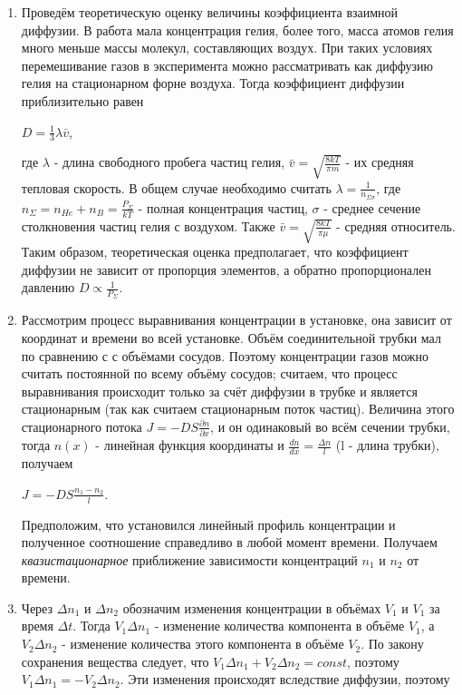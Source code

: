 \documentclass[12pt,a4paper]{article}
\begin{document}
\begin{enumerate}
\item Проведём теоретическую оценку величины коэффициента взаимной диффузии. В работа мала концентрация гелия, более того, масса атомов гелия много меньше массы молекул, составляющих воздух. При таких условиях перемешивание газов в эксперимента можно рассматривать как диффузию гелия на стационарном форне воздуха. Тогда коэффициент диффузии приблизительно равен
\begin{center}
$D = \frac{1}{3}\lambda \bar v$,
\end{center}
где $\lambda$ - длина свободного пробега частиц гелия, $\bar v = \sqrt{\frac{8kT}{\pi m}}$ - их средняя тепловая скорость. В общем случае необходимо считать $\lambda = \frac{1}{n_{\Sigma \sigma}}$, где $n_{\Sigma} = n_{He} + n_{B} = \frac{P_{\Sigma}}{kT}$ - полная концентрация частиц, $\sigma$ -  среднее сечение столкновения частиц гелия с воздухом. Также  $\bar v = \sqrt{\frac{8kT}{\pi \mu}}$ - средняя относитель. Таким образом, теоретическая оценка предполагает, что коэффициент диффузии не зависит от пропорция элементов, а обратно пропорционален давлению $D \propto \frac{1}{P_{\Sigma}}$.
\item  Рассмотрим процесс выравнивания концентрации в установке, она зависит от координат и времени во всей установке. Объём соединительной трубки мал по сравнению с с объёмами сосудов. Поэтому концентрации газов можно считать постоянной по всему объёму сосудов; считаем, что процесс выравнивания происходит только за счёт диффузии в трубке и является стационарным (так как считаем стационарным поток частиц). Величина этого стационарного потока $J = -DS\frac{\partial n}{\partial x}$, и он одинаковый во всём сечении трубки, тогда $n(x)$ - линейная функция координаты и $\frac{dn}{dx} = \frac{\Delta n}{l}$ (l - длина трубки), получаем 
\begin{center}
$J = -DS \frac{n_{1}-n_{2}}{l}$.
\end{center}
Предположим, что установился линейный профиль концентрации и полученное соотношение справедливо в любой момент времени. Получаем {\sl квазистационарное} приближение зависимости концентраций $n_1$ и $n_2$ от времени.
\item Через $\Delta n_1$ и $\Delta n_2$ обозначим изменения концентрации в объёмах $V_1$ и $V_1$ за время $\Delta t$. Тогда $V_1 \Delta n_1$ - изменение количества компонента в объёме $V_1$, а $V_2 \Delta n_2$ - изменение количества этого компонента в объёме $V_2$. По закону сохранения вещества следует, что $V_1 \Delta n_1 + V_2 \Delta n_2 = const$, поэтому $V_1 \Delta n_1 = - V_2 \Delta n_2$. Эти изменения происходят вследствие диффузии, поэтому 

\end{enumerate}
\end{document}
